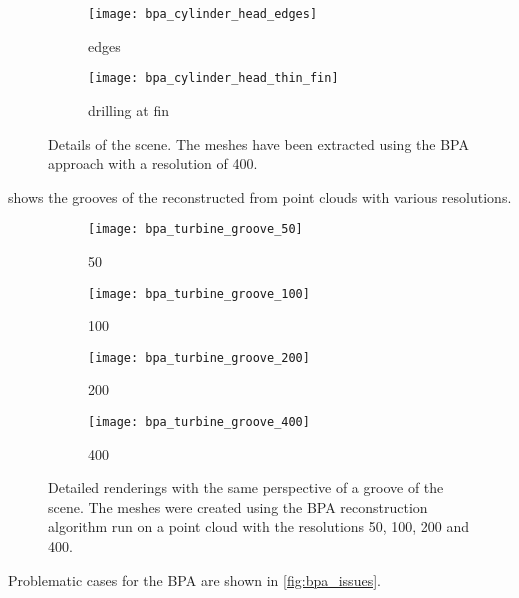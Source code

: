 \begin{figure}
	\centering
	\begin{subfigure}[b]{0.49\textwidth}
		\centering
		\texttt{[image: bpa\_cylinder\_head\_edges]}
		\caption{\cylinderhead edges}
		\label{fig:bpa_cylinder_head_edges}
	\end{subfigure}
	\begin{subfigure}[b]{0.49\textwidth}
		\centering
		\texttt{[image: bpa\_cylinder\_head\_thin\_fin]}
		\caption{\cylinderhead drilling at fin}
		\label{fig:bpa_cylinder_head_thin_fin}
	\end{subfigure}
	\caption{
		Details of the \cylinderhead scene.
		The meshes have been extracted using the BPA approach with a resolution of 400.
	}
	\label{fig:bpa_cylinder_head_details}
\end{figure}

 shows the grooves of the \turbine reconstructed from point clouds with various resolutions.

\begin{figure}
	\centering
	\begin{subfigure}[b]{0.24\textwidth}
		\centering
		\texttt{[image: bpa\_turbine\_groove\_50]}
		\caption{50}
		\label{fig:bpa_turbine_groove_50}
	\end{subfigure}
	\begin{subfigure}[b]{0.24\textwidth}
		\centering
		\texttt{[image: bpa\_turbine\_groove\_100]}
		\caption{100}
		\label{fig:bpa_turbine_groove_100}
	\end{subfigure}
	\begin{subfigure}[b]{0.24\textwidth}
		\centering
		\texttt{[image: bpa\_turbine\_groove\_200]}
		\caption{200}
		\label{fig:bpa_turbine_groove_200}
	\end{subfigure}
	\begin{subfigure}[b]{0.24\textwidth}
		\centering
		\texttt{[image: bpa\_turbine\_groove\_400]}
		\caption{400}
		\label{fig:bpa_turbine_groove_400}
	\end{subfigure}
	\caption{
		Detailed renderings with the same perspective of a groove of the \turbine scene.
		The meshes were created using the BPA reconstruction algorithm run on a point cloud with the resolutions 50, 100, 200 and 400.
	}
	\label{fig:bpa_grooves}
\end{figure}

Problematic cases for the BPA are shown in \cref{fig:bpa_issues}.

